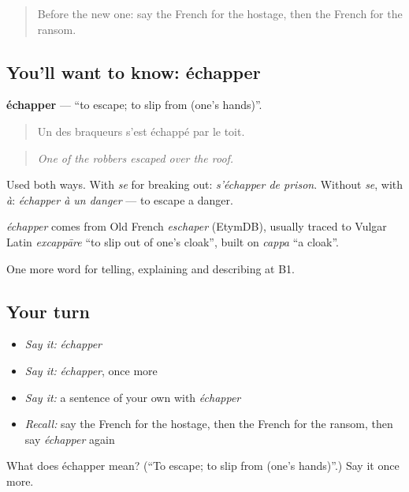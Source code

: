 \label{lesson:FR-C296-echapper}



\begin{quote}
Before the new one: say the French for the hostage, then the French for the ransom.
\end{quote}

\subsection*{You'll want to know: échapper}
\textbf{échapper} — \textquotedblleft{}to escape; to slip from (one's hands)\textquotedblright{}.

\begin{quote}
Un des braqueurs s'est échappé par le toit.
\end{quote}

\begin{quote}
\emph{One of the robbers escaped over the roof.}
\end{quote}

Used both ways. With \emph{se} for breaking out: \emph{s'échapper de prison}. Without \emph{se}, with \emph{à}: \emph{échapper à un danger} — to escape a danger.

\begin{cousinweb}
\emph{échapper} comes from Old French \emph{eschaper} (EtymDB), usually traced to Vulgar Latin \emph{excappāre} \textquotedblleft{}to slip out of one's cloak\textquotedblright{}, built on \emph{cappa} \textquotedblleft{}a cloak\textquotedblright{}.
\end{cousinweb}

\begin{grammarlens}[title={What you've built}]
One more word for telling, explaining and describing at B1.
\end{grammarlens}

\subsection*{Your turn}
\begin{itemize}
\raggedright
  \item \emph{Say it:} \emph{échapper}
  \item \emph{Say it:} \emph{échapper}, once more
  \item \emph{Say it:} a sentence of your own with \emph{échapper}
  \item \emph{Recall:} say the French for the hostage, then the French for the ransom, then say \emph{échapper} again
\end{itemize}

\begin{tcolorbox}[breakable,colback=teal!4,colframe=teal!35!black,title={Before you move on}]
What does échapper mean? (\textquotedblleft{}To escape; to slip from (one's hands)\textquotedblright{}.) Say it once more.
\end{tcolorbox}
